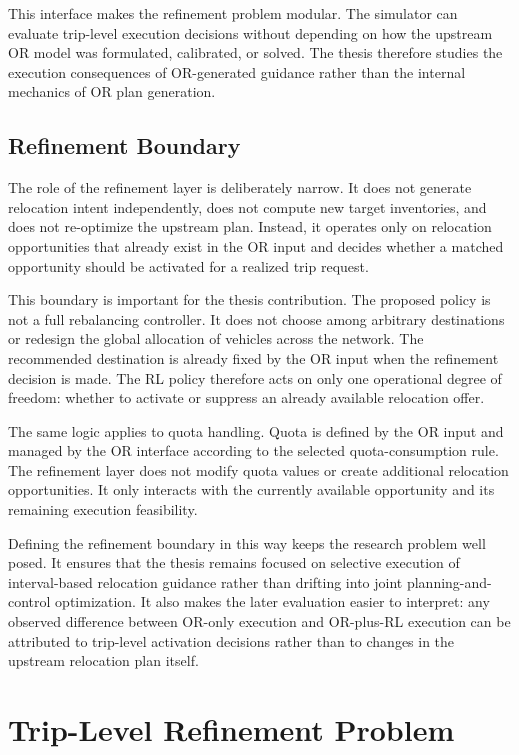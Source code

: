 This interface makes the refinement problem modular. The simulator can evaluate trip-level execution decisions without depending on how the upstream OR model was formulated, calibrated, or solved. The thesis therefore studies the execution consequences of OR-generated guidance rather than the internal mechanics of OR plan generation.

\subsection{Refinement Boundary}

The role of the refinement layer is deliberately narrow. It does not generate relocation intent independently, does not compute new target inventories, and does not re-optimize the upstream plan. Instead, it operates only on relocation opportunities that already exist in the OR input and decides whether a matched opportunity should be activated for a realized trip request.

This boundary is important for the thesis contribution. The proposed policy is not a full rebalancing controller. It does not choose among arbitrary destinations or redesign the global allocation of vehicles across the network. The recommended destination is already fixed by the OR input when the refinement decision is made. The RL policy therefore acts on only one operational degree of freedom: whether to activate or suppress an already available relocation offer.

The same logic applies to quota handling. Quota is defined by the OR input and managed by the OR interface according to the selected quota-consumption rule. The refinement layer does not modify quota values or create additional relocation opportunities. It only interacts with the currently available opportunity and its remaining execution feasibility.

Defining the refinement boundary in this way keeps the research problem well posed. It ensures that the thesis remains focused on selective execution of interval-based relocation guidance rather than drifting into joint planning-and-control optimization. It also makes the later evaluation easier to interpret: any observed difference between OR-only execution and OR-plus-RL execution can be attributed to trip-level activation decisions rather than to changes in the upstream relocation plan itself.


\section{Trip-Level Refinement Problem}

